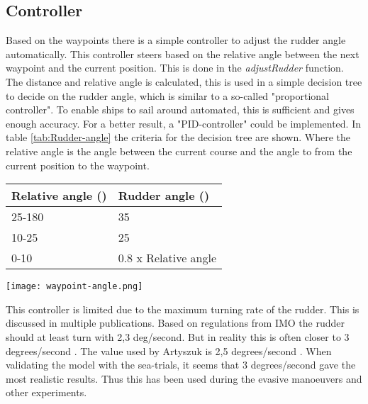 \subsection{Controller}
Based on the waypoints there is a simple controller to adjust the rudder angle automatically. This controller steers based on the relative angle between the next waypoint and the current position. This is done in the \emph{adjustRudder} function. The distance and relative angle is calculated, this is used in a simple decision tree to decide on the rudder angle, which is similar to a so-called "proportional controller". To enable ships to sail around automated, this is sufficient and gives enough accuracy. For a better result, a "PID-controller" could be implemented. In table \ref{tab:Rudder-angle} the criteria for the decision tree are shown. Where the relative angle is the angle between the current course and the angle to from the current position to the waypoint. 

\begin{minipage}{\textwidth}
	\begin{minipage}[b]{0.52\textwidth}
	\centering
	\begin{tabular}{l|l}
		\toprule
		Relative angle (\degree) & Rudder angle (\degree) \\
		\midrule
		25-180 & 35\\
		10-25 & 25\\
		0-10 & 0.8 x Relative angle \\
		\bottomrule
	\end{tabular}
	
	\label{tab:Rudder-angle}
	\end{minipage}
	\hfill
	\begin{minipage}[b]{0.47\textwidth}
		\centering
		\texttt{[image: waypoint-angle.png]}
		\label{fig:waypoint-angle}
	\end{minipage}
\end{minipage}

This controller is limited due to the maximum turning rate of the rudder. This is discussed in multiple publications. Based on regulations from IMO the rudder should at least turn with 2,3 deg/second. But in reality this is often closer to 3 degrees/second \cite{Molland2007}. The value used by Artyszuk is 2,5 degrees/second \cite{Artyszuk2016}. When validating the model with the sea-trials, it seems that 3 degrees/second gave the most realistic results. Thus this has been used during the evasive manoeuvers and other experiments.



